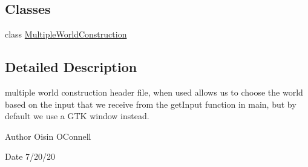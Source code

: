 \subsection*{Classes}
\begin{DoxyCompactItemize}
\item 
class \hyperlink{classMultipleWorldConstruction}{Multiple\+World\+Construction}
\end{DoxyCompactItemize}


\subsection{Detailed Description}
multiple world construction header file, when used allows us to choose the world based on the input that we receive from the get\+Input function in main, but by default we use a G\+TK window instead. 

\begin{DoxyAuthor}{Author}
Oisin O\textquotesingle{}Connell
\end{DoxyAuthor}
\begin{DoxyDate}{Date}
7/20/20 
\end{DoxyDate}
